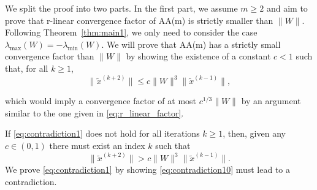 \documentclass[11pt]{article}
\begin{document}
{We split the proof into two parts. In the first part, we assume $m\geq 2$ and aim to prove that r-linear convergence factor of AA(m) is strictly smaller than $\|W\|$.
Following Theorem~\ref{thm:main1}, we only need to consider the case $\lambda_{\max}(W) = -\lambda_{\min}(W)$. We will prove that AA(m) has a strictly small convergence factor than $\|W\|$ %
by showing the existence of a constant $c<1$ such that, for all $k\geq 1$,
\begin{equation}\label{eq:contradiction1}
\|\widetilde{x}^{(k+2)}\| \leq c \|W\|^3\|\widetilde{x}^{(k-1)}\|,
\end{equation}
{which would imply a convergence factor of at most $c^{1/3}\|W\|$ by an argument similar to the one given in \eqref{eq:r_linear_factor}.


 If \eqref{eq:contradiction1} does not hold for all iterations $k\geq 1$, then, 
given any $c \in (0,1)$ there must exist an index $k$ such
that 
\begin{equation}\label{eq:contradiction10}
\|\widetilde{x}^{(k+2)}\| > c \|W\|^3\|\widetilde{x}^{(k-1)}\|. 
\end{equation}
We prove \eqref{eq:contradiction1} by showing \eqref{eq:contradiction10} must lead to a contradiction.

}}
\end{document}
